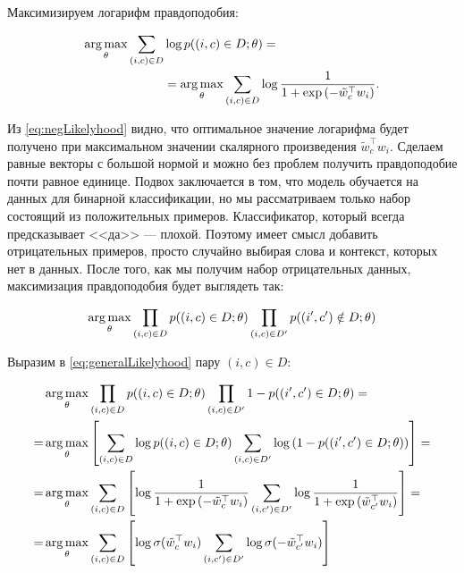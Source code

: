 Максимизируем логарифм правдоподобия:

\begin{equation} \label{eq:negLikelyhood}
\begin{aligned}
 \operatorname*{arg\,max}_{\theta} \sum_{(i,c)\in D} & \log{p((i,c)\in D;\theta)} = \\
 & = \operatorname*{arg\,max}_{\theta} \sum_{(i,c)\in D} \log{\frac{1}{1+\exp{(-\tilde{w}_c^{\top} w_i)}}}.
\end{aligned}
\end{equation}

Из \ref{eq:negLikelyhood} видно, что оптимальное значение логарифма будет получено при максимальном значении скалярного произведения $\tilde{w}_c^{\top} w_i$. Сделаем равные векторы с большой нормой и можно без проблем получить правдоподобие почти равное единице. Подвох заключается в том, что модель обучается на данных для бинарной классификации, но мы рассматриваем только набор состоящий из положительных примеров. Классификатор, который всегда предсказывает <<да>> --- плохой. Поэтому имеет смысл добавить отрицательных примеров, просто случайно выбирая слова и контекст, которых нет в данных. После того, как мы получим набор отрицательных данных, максимизация правдоподобия будет выглядеть так:

\begin{equation} \label{eq:generalLikelyhood}
 \operatorname*{arg\,max}_{\theta} \prod_{(i,c)\in D} p((i,c)\in D;\theta) \prod_{(i,c)\in D'} p((i',c')\notin D;\theta)
\end{equation}

Выразим в \ref{eq:generalLikelyhood} пару $(i,c) \in D$:

\begin{equation}
\begin{aligned}
 & \operatorname*{arg\,max}_{\theta} \prod_{(i,c)\in D} p((i,c)\in D;\theta) \prod_{(i,c)\in D'} 1-p((i',c')\in D;\theta) = \\
 = & \operatorname*{arg\,max}_{\theta} \left[\sum_{(i,c)\in D} \log{p((i,c)\in D;\theta)} \sum_{(i,c)\in D'} \log{( 1-p((i',c')\in D;\theta))} \right] = \\
 = & \operatorname*{arg\,max}_{\theta} \sum_{(i,c)\in D} \left[\log{\frac{1}{1+\exp{(-\tilde{w}_c^{\top} w_i)}}} \sum_{(i,c')\in D'} \log{\frac{1}{1+\exp{(\tilde{w}_{c'}^{\top} w_i)}}} \right] = \\
 = & \operatorname*{arg\,max}_{\theta} \sum_{(i,c)\in D} \left[\log\sigma(\tilde{w}_c^{\top} w_i) \sum_{(i,c')\in D'} \log\sigma(-\tilde{w}_{c'}^{\top} w_i)\right]
\end{aligned}
\end{equation}

